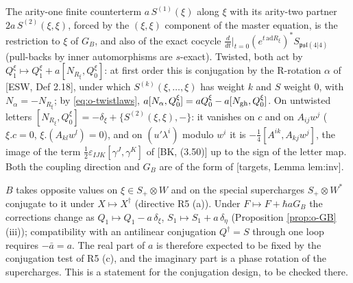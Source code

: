 \begin{remark}
\label{rem:o-alpha}
The arity-one finite counterterm $a\,S^{(1)}(\xi)$ along $\xi$ with its arity-two partner $2a\,S^{(2)}(\xi,\xi)$, forced by the $(\xi,\xi)$ component of the master equation, is the restriction to $\xi$ of $G_B$, and also of the exact cocycle $\frac{d}{dt}|_{t=0}(e^{t\,\mathrm{ad}R_\xi})^*S_{\mathfrak{psl}(4|4)}$ (pull-backs by inner automorphisms are $s$-exact). Twisted, both act by $Q_1^\xi\mapsto Q_1^\xi+a[N_{R_\xi},Q_0^\xi]$: at first order this is conjugation by the R-rotation $\alpha$ of [ESW, Def 2.18], under which $S^{(k)}(\xi,\dots,\xi)$ has weight $k$ and $S$ weight $0$, with $N_\alpha=-N_{R_\xi}$; by \eqref{eq:o-twistlaws}, $a[N_\alpha,Q_0^\xi]=aQ_0^\xi-a[N_{\rm gh},Q_0^\xi]$. On untwisted letters $[N_{R_\xi},Q_0^\xi]=-\delta_\xi+\{S^{(2)}(\xi,\xi),-\}$: it vanishes on $c$ and on $A_{ij}w^j$ ($\xi.c=0$, $\xi.(A_{kl}w^l)=0$), and on $(u'\lambda^i)$ modulo $w^i$ it is $-\tfrac14[A^{ik},A_{kj}w^j]$, the image of the term $\tfrac12\varepsilon_{IJK}[\gamma^J,\gamma^K]$ of [BK, (3.50)] up to the sign of the letter map. Both the coupling direction and $G_B$ are of the form of [targets, Lemma lem:inv].
\end{remark}

\begin{remark}
\label{rem:o-GBdagger}
$B$ takes opposite values on $\xi\in S_+\otimes W$ and on the special supercharges $S_+\otimes W^*$ conjugate to it under $X\mapsto X^\dagger$ (directive R5 (a)). Under $F\mapsto F+\hbar aG_B$ the corrections change as $Q_1\mapsto Q_1-a\,\delta_\xi$, $S_1\mapsto S_1+a\,\delta_\eta$ (Proposition \ref{prop:o-GB} (iii)); compatibility with an antilinear conjugation $Q^\dagger=S$ through one loop requires $-\bar a=a$. The real part of $a$ is therefore expected to be fixed by the conjugation test of R5 (c), and the imaginary part is a phase rotation of the supercharges. This is a statement for the conjugation design, to be checked there.
\end{remark}

